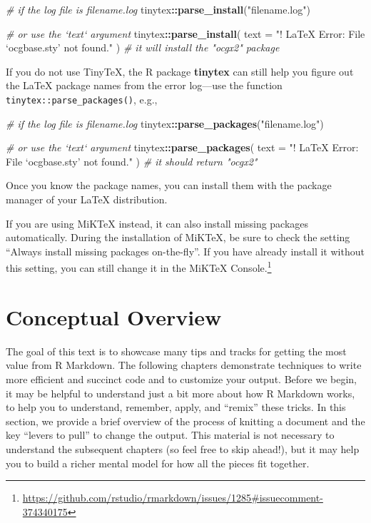 \documentclass[
  11pt,
]{krantz}
\newenvironment{Shaded}{\begin{snugshade}}{\end{snugshade}}
\newcommand{\CommentTok}[1]{\textcolor[rgb]{0.37,0.37,0.37}{\textit{#1}}}
\newcommand{\DataTypeTok}[1]{\textcolor[rgb]{0.27,0.27,0.27}{#1}}
\newcommand{\KeywordTok}[1]{\textcolor[rgb]{0.27,0.27,0.27}{\textbf{#1}}}
\newcommand{\NormalTok}[1]{#1}
\newcommand{\OperatorTok}[1]{\textcolor[rgb]{0.43,0.43,0.43}{\textbf{#1}}}
\newcommand{\StringTok}[1]{\textcolor[rgb]{0.5,0.5,0.5}{#1}}
\renewcommand{\href}[2]{#2\footnote{\url{#1}}}
\begin{document}
\begin{Shaded}
\begin{Highlighting}[]
\CommentTok{# if the log file is filename.log}
\NormalTok{tinytex}\OperatorTok{::}\KeywordTok{parse_install}\NormalTok{(}\StringTok{"filename.log"}\NormalTok{)}

\CommentTok{# or use the `text` argument}
\NormalTok{tinytex}\OperatorTok{::}\KeywordTok{parse_install}\NormalTok{(}
  \DataTypeTok{text =} \StringTok{"! LaTeX Error: File `ocgbase.sty' not found."}
\NormalTok{)}
\CommentTok{# it will install the "ocgx2" package}
\end{Highlighting}
\end{Shaded}

If you do not use TinyTeX, the R package \textbf{tinytex} can still help you figure out the LaTeX package names from the error log---use the function \texttt{tinytex::parse\_packages()}, e.g.,

\begin{Shaded}
\begin{Highlighting}[]
\CommentTok{# if the log file is filename.log}
\NormalTok{tinytex}\OperatorTok{::}\KeywordTok{parse_packages}\NormalTok{(}\StringTok{"filename.log"}\NormalTok{)}

\CommentTok{# or use the `text` argument}
\NormalTok{tinytex}\OperatorTok{::}\KeywordTok{parse_packages}\NormalTok{(}
  \DataTypeTok{text =} \StringTok{"! LaTeX Error: File `ocgbase.sty' not found."}
\NormalTok{)}
\CommentTok{# it should return "ocgx2"}
\end{Highlighting}
\end{Shaded}

Once you know the package names, you can install them with the package manager of your LaTeX distribution.

If you are using MiKTeX instead, it can also install missing packages automatically. During the installation of MiKTeX, be sure to check the setting ``Always install missing packages on-the-fly''. If you have already install it without this setting, \href{https://github.com/rstudio/rmarkdown/issues/1285\#issuecomment-374340175}{you can still change it in the MiKTeX Console.}

\hypertarget{conceptual-overview}{%
\chapter{Conceptual Overview}\label{conceptual-overview}}

The goal of this text is to showcase many tips and tracks for getting the most value from R Markdown. The following chapters demonstrate techniques to write more efficient and succinct code and to customize your output. Before we begin, it may be helpful to understand just a bit more about how R Markdown works, to help you to understand, remember, apply, and ``remix'' these tricks. In this section, we provide a brief overview of the process of knitting a document and the key ``levers to pull'' to change the output. This material is not necessary to understand the subsequent chapters (so feel free to skip ahead!), but it may help you to build a richer mental model for how all the pieces fit together.
\end{document}
